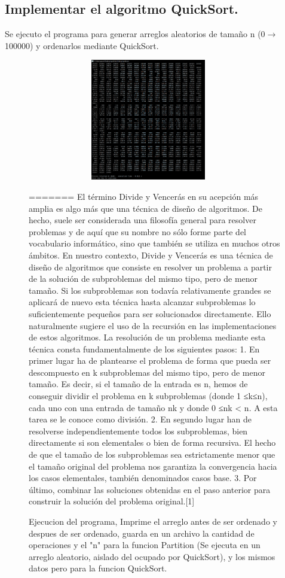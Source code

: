 \documentclass[spanish]{article}
\begin{document}
	\subsection{Implementar el algoritmo QuickSort.}
	Se ejecuto el programa para generar arreglos aleatorios de tamaño n (0$\rightarrow$100000) y ordenarlos mediante QuickSort.			
	\begin{figure}[h!]
		\centering
		\includegraphics[width=400px,height=200px]{ejecucionPrimeraParte}
		\caption{Ejecucion del programa, Imprime el arreglo antes de ser ordenado y despues de ser ordenado, guarda en un archivo la cantidad de operaciones y el "n" para la funcion Partition (Se ejecuta en un arreglo aleatorio, aislado del ocupado por QuickSort), y los mismos datos pero para la funcion QuickSort.}
=======
	El  término  Divide  y  Vencerás  en  su  acepción  más  amplia  es  algo  más  que  una  técnica  de  diseño  de  algoritmos.  De  hecho,  suele  ser  considerada  una  filosofía  general  para  resolver  problemas  y  de  aquí  que  su  nombre  no  sólo  forme  parte  del  vocabulario informático, sino que también se utiliza en muchos otros ámbitos.      En nuestro contexto, Divide y Vencerás es una técnica de diseño de algoritmos que  consiste  en  resolver  un  problema  a  partir  de  la  solución  de  subproblemas  del  mismo tipo, pero de menor tamaño. Si los subproblemas son todavía relativamente grandes   se   aplicará   de   nuevo   esta   técnica   hasta   alcanzar   subproblemas   lo   suficientemente  pequeños  para  ser  solucionados  directamente.  Ello  naturalmente  sugiere el uso de la recursión en las implementaciones de estos algoritmos.       La  resolución  de  un  problema  mediante  esta  técnica  consta  fundamentalmente  de los siguientes pasos: 1.   En   primer   lugar   ha   de   plantearse   el   problema   de   forma   que   pueda   ser   descompuesto  en  k  subproblemas  del  mismo  tipo,  pero  de  menor  tamaño.  Es  decir, si el tamaño de la entrada es n, hemos de conseguir dividir el problema en k  subproblemas  (donde  1  ≤k≤n),  cada  uno  con  una  entrada  de  tamaño  nk  y  donde 0 ≤nk < n. A esta tarea se le conoce como división. 2.    En    segundo    lugar    han    de    resolverse    independientemente    todos    los    subproblemas,  bien  directamente  si  son  elementales  o  bien  de  forma  recursiva.  El hecho de que el tamaño de los subproblemas sea estrictamente menor que el tamaño  original  del  problema  nos  garantiza  la  convergencia  hacia  los  casos  elementales, también denominados casos base. 3.  Por  último,  combinar las soluciones obtenidas en el paso anterior para construir la solución del problema original.[1]	

\end{figure}
\end{document}
